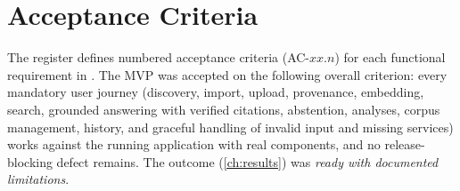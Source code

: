 \section{Acceptance Criteria}

The register defines numbered acceptance criteria (AC-$xx$.$n$) for each functional requirement in
. The MVP was accepted on the following overall criterion: every
mandatory user journey (discovery, import, upload, provenance, embedding, search, grounded answering with verified
citations, abstention, analyses, corpus management, history, and graceful handling of invalid input and missing
services) works against the running application with real components, and no release-blocking defect remains. The
outcome (\autoref{ch:results}) was \emph{ready with documented limitations}.
